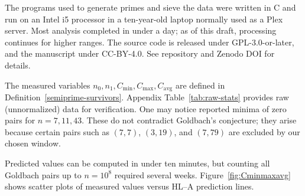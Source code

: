 \documentclass[11pt]{article}
\theoremstyle{inline}
\theoremstyle{break}
\theoremstyle{break}
\theoremstyle{break}
\theoremstyle{break}
\theoremstyle{break}
\theoremstyle{inline}
\newcommand{\tavg}{{\scriptscriptstyle\mathrm{avg}}}
\newcommand{\Cmeas}{C}              %
\newcommand{\Nmeas}{n}              %
\begin{document}
The programs used to generate primes and sieve the data were written in C and run on an Intel i5 processor in a ten-year-old laptop normally used as a Plex server. Most analysis completed in under a day; as of this draft, processing continues for higher ranges. The source code is released under GPL-3.0-or-later, and the manuscript under CC-BY-4.0. See repository and Zenodo DOI for details.

The measured variables \( \Nmeas_0, \Nmeas_1, \Cmeas_{\min}, \Cmeas_{\max}, \Cmeas_{\tavg} \) are defined in Definition~\ref{semiprime-survivors}. Appendix Table~\ref{tab:raw-stats} provides raw (unnormalized) data for verification. One may notice reported minima of zero pairs for \( n=7,11,43 \). These do not contradict Goldbach’s conjecture; they arise because certain pairs such as \( (7,7) \), \( (3,19) \), and \( (7,79) \) are excluded by our chosen window.

Predicted values can be computed in under ten minutes, but counting all Goldbach pairs up to \( n=10^8 \) required several weeks. Figure~\ref{fig:Cminmaxavg} shows scatter plots of measured values versus HL–A prediction lines.

\pairdata
\end{document}
